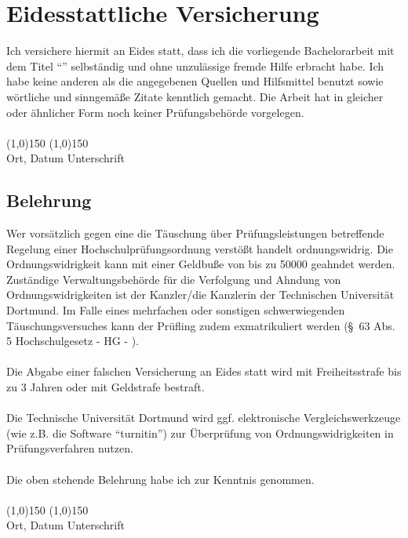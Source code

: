 \newpage
\thispagestyle{empty}
\section*{Eidesstattliche Versicherung}
\noindent
Ich versichere hiermit an Eides statt, dass ich die vorliegende Bachelorarbeit mit dem Titel \enquote{\thetitle} selbständig und ohne unzulässige fremde Hilfe erbracht habe.
Ich habe keine anderen als die angegebenen Quellen und Hilfsmittel benutzt sowie wörtliche und sinngemäße Zitate kenntlich gemacht.
Die Arbeit hat in gleicher oder ähnlicher Form noch keiner Prüfungsbehörde vorgelegen.
\vspace*{1cm}
\ \\
\ \\
\line(1,0){150} \hfill \line(1,0){150} \\
Ort, Datum \hfill Unterschrift \hspace*{3cm}
\vspace*{1.5cm}

\subsection*{Belehrung}
Wer vorsätzlich gegen eine die Täuschung über Prüfungsleistungen betreffende Regelung einer Hochschulprüfungsordnung verstößt handelt ordnungswidrig.
Die Ordnungswidrigkeit kann mit einer Geldbuße von bis zu \SI[round-mode=places, round-precision=2]{50000}{\officialeuro} geahndet werden.
Zuständige Verwaltungsbehörde für die Verfolgung und Ahndung von Ordnungswidrigkeiten ist der Kanzler/die Kanzlerin der Technischen Universität Dortmund.
Im Falle eines mehrfachen oder sonstigen schwerwiegenden Täuschungsversuches kann der Prüfling zudem exmatrikuliert werden (\S\ 63 Abs. 5 Hochschulgesetz - HG - ). \\
\ \\
Die Abgabe einer falschen Versicherung an Eides statt wird mit Freiheitsstrafe bis zu 3 Jahren oder mit Geldstrafe bestraft. \\
\ \\
Die Technische Universität Dortmund wird ggf. elektronische Vergleichswerkzeuge (wie z.B. die Software \enquote{turnitin}) zur Überprüfung von Ordnungswidrigkeiten in Prüfungsverfahren nutzen. \\
\ \\
Die oben stehende Belehrung habe ich zur Kenntnis genommen.
\vspace*{1cm}
\ \\
\ \\
\line(1,0){150} \hfill \line(1,0){150}\\
Ort, Datum \hfill Unterschrift \hspace*{3cm}
